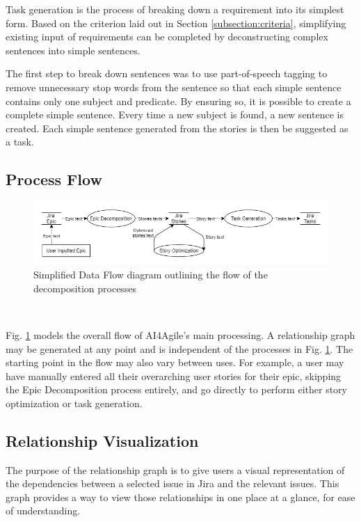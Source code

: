 Task generation is the process of breaking down a requirement into its simplest form. Based on the criterion laid out in Section \ref{subsection:criteria}, simplifying existing input of requirements can be completed by deconstructing complex sentences into simple sentences. 

The first step to break down sentences was to use part-of-speech tagging to remove unnecessary stop words from the sentence so that each simple sentence contains only one subject and predicate. By ensuring so, it is possible to create a complete simple sentence. Every time a new subject is found, a new sentence is created. Each simple sentence generated from the stories is then be suggested as a task.

\subsection{Process Flow}

\begin{figure}
\centering
\includegraphics[width=\textwidth,keepaspectratio]{./figure/ExampleDataFlowDiagram.png}
\caption{Simplified Data Flow diagram outlining the flow of the decomposition processes}
\label{fig:ExampleDataFlowDiagram}
\end{figure}\

Fig. \ref{fig:ExampleDataFlowDiagram} models the overall flow of AI4Agile’s main processing. A relationship graph may be generated at any point and is independent of the processes in Fig. \ref{fig:ExampleDataFlowDiagram}.  The starting point in the flow may also vary between uses. For example, a user may have manually entered all their overarching user stories for their epic, skipping the Epic Decomposition process entirely, and go directly to perform either story optimization or task generation.

\subsection{Relationship Visualization}
The purpose of the relationship graph is to give users a visual representation of the dependencies between a selected issue in Jira and the relevant issues. This graph provides a way to view those relationships in one place at a glance, for ease of understanding.

